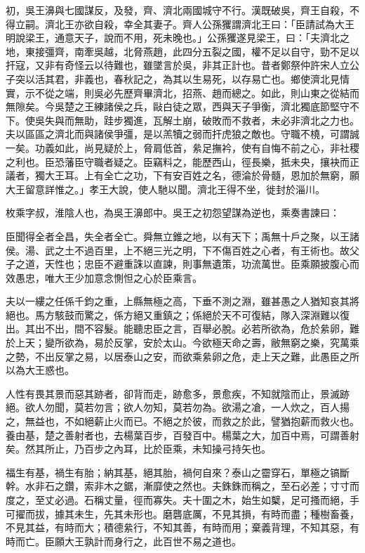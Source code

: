 \begin{pinyinscope}
初，吳王濞與七國謀反，及發，齊、濟北兩國城守不行。漢既破吳，齊王自殺，不得立嗣。濟北王亦欲自殺，幸全其妻子。齊人公孫玃謂濟北王曰：「臣請試為大王明說梁王，通意天子，說而不用，死未晚也。」公孫玃遂見梁王，曰：「夫濟北之地，東接彊齊，南牽吳越，北脅燕趙，此四分五裂之國，權不足以自守，勁不足以扞寇，又非有奇怪云以待難也，雖墜言於吳，非其正計也。昔者鄭祭仲許宋人立公子突以活其君，非義也，春秋記之，為其以生易死，以存易亡也。鄉使濟北見情實，示不從之端，則吳必先歷齊畢濟北，招燕、趙而總之。如此，則山東之從結而無隙矣。今吳楚之王練諸侯之兵，敺白徒之眾，西與天子爭衡，濟北獨底節堅守不下。使吳失與而無助，跬步獨進，瓦解土崩，破敗而不救者，未必非濟北之力也。夫以區區之濟北而與諸侯爭彊，是以羔犢之弱而扞虎狼之敵也。守職不橈，可謂誠一矣。功義如此，尚見疑於上，脅肩低首，絫足撫衿，使有自悔不前之心，非社稷之利也。臣恐藩臣守職者疑之。臣竊料之，能歷西山，徑長樂，抵未央，攘袂而正議者，獨大王耳。上有全亡之功，下有安百姓之名，德淪於骨髓，恩加於無窮，願大王留意詳惟之。」孝王大說，使人馳以聞。濟北王得不坐，徙封於淄川。

枚乘字叔，淮陰人也，為吳王濞郎中。吳王之初怨望謀為逆也，乘奏書諫曰：

臣聞得全者全昌，失全者全亡。舜無立錐之地，以有天下；禹無十戶之聚，以王諸侯。湯、武之土不過百里，上不絕三光之明，下不傷百姓之心者，有王術也。故父子之道，天性也；忠臣不避重誅以直諫，則事無遺策，功流萬世。臣乘願披腹心而效愚忠，唯大王少加意念惻怛之心於臣乘言。

夫以一縷之任係千鈞之重，上縣無極之高，下垂不測之淵，雖甚愚之人猶知哀其將絕也。馬方駭鼓而驚之，係方絕又重鎮之；係絕於天不可復結，隊入深淵難以復出。其出不出，間不容髮。能聽忠臣之言，百舉必脫。必若所欲為，危於絫卵，難於上天；變所欲為，易於反掌，安於太山。今欲極天命之壽，敝無窮之樂，究萬乘之勢，不出反掌之易，以居泰山之安，而欲乘絫卵之危，走上天之難，此愚臣之所以為大王惑也。

人性有畏其景而惡其跡者，卻背而走，跡愈多，景愈疾，不知就陰而止，景滅跡絕。欲人勿聞，莫若勿言；欲人勿知，莫若勿為。欲湯之凔，一人炊之，百人揚之，無益也，不如絕薪止火而已。不絕之於彼，而救之於此，譬猶抱薪而救火也。養由基，楚之善射者也，去楊葉百步，百發百中。楊葉之大，加百中焉，可謂善射矣。然其所止，乃百步之內耳，比於臣乘，未知操弓持矢也。

福生有基，禍生有胎；納其基，絕其胎，禍何自來？泰山之霤穿石，單極之镐斷幹。水非石之鑽，索非木之鋸，漸靡使之然也。夫銖銖而稱之，至石必差；寸寸而度之，至丈必過。石稱丈量，徑而寡失。夫十圍之木，始生如櫱，足可搔而絕，手可擢而拔，據其未生，先其未形也。磨礱底厲，不見其損，有時而盡；種樹畜養，不見其益，有時而大；積德絫行，不知其善，有時而用；棄義背理，不知其惡，有時而亡。臣願大王孰計而身行之，此百世不易之道也。


\end{pinyinscope}
